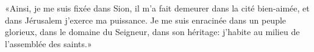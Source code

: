 «Ainsi, je me suis fixée dans Sion,
	il m’a fait demeurer dans la cité bien-aimée,
	et dans Jérusalem j’exerce ma puissance.
Je me suis enracinée dans un peuple glorieux,
	dans le domaine du Seigneur, dans son héritage:
	j’habite au milieu de l’assemblée des saints.»
